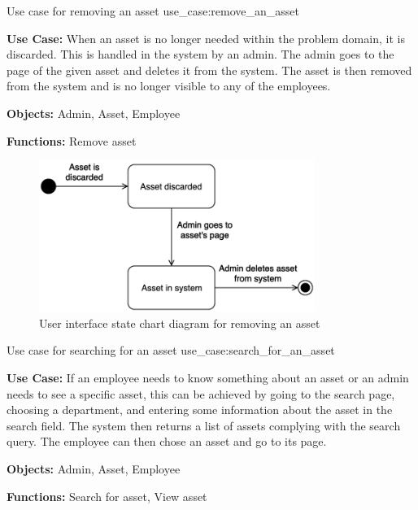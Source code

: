 \newpage

    {Use case for removing an asset}
    {use_case:remove_an_asset}
    {
        \textbf{Use Case:} When an asset is no longer needed within the problem domain, it is discarded. This is handled in the system by an admin. The admin goes to the page of the given asset and deletes it from the system. The asset is then removed from the system and is no longer visible to any of the employees.
    
        \vskip 0.2cm
        
        \textbf{Objects:} Admin, Asset, Employee
        
        \vskip 0.2cm
        
        \textbf{Functions:} Remove asset
    }

\begin{figure}[H]
    \centering
    \includegraphics[width=0.8\textwidth]{figures/UseCases/UC_Remove_asset.png}
    \caption{User interface state chart diagram for removing an asset}
    \label{fig:remove_asset_statechart}
\end{figure}

\newpage

    {Use case for searching for an asset}
    {use_case:search_for_an_asset}
    {
        \textbf{Use Case:} If an employee needs to know something about an asset or an admin needs to see a specific asset, this can be achieved by going to the search page, choosing a department, and entering some information about the asset in the search field. The system then returns a list of assets complying with the search query. The employee can then chose an asset and go to its page.
    
        \vskip 0.2cm
        
        \textbf{Objects:} Admin, Asset, Employee
        
        \vskip 0.2cm
        
        \textbf{Functions:} Search for asset, View asset
    }

